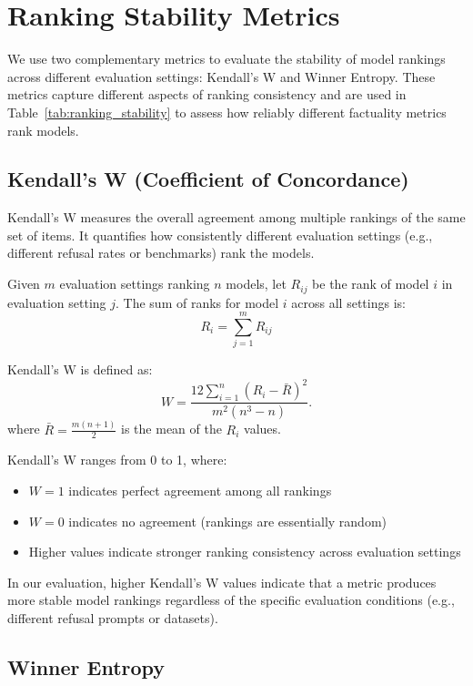 \section{Ranking Stability Metrics}
\label{app:ranking_metrics}

We use two complementary metrics to evaluate the stability of model rankings across different evaluation settings: Kendall's W and Winner Entropy. These metrics capture different aspects of ranking consistency and are used in Table~\ref{tab:ranking_stability} to assess how reliably different factuality metrics rank models.

\subsection{Kendall's W (Coefficient of Concordance)}

Kendall's W measures the overall agreement among multiple rankings of the same set of items. It quantifies how consistently different evaluation settings (e.g., different refusal rates or benchmarks) rank the models.

Given $m$ evaluation settings ranking $n$ models, let $R_{ij}$ be the rank of model $i$ in evaluation setting $j$. The sum of ranks for model $i$ across all settings is:
\[
R_i = \sum_{j=1}^{m} R_{ij}
\]

Kendall's W is defined as:
\[
W = \frac{12 \sum_{i=1}^{n} (R_i - \bar{R})^2}{m^2(n^3 - n)}.
\]
where $\bar{R} = \frac{m(n+1)}{2}$ is the mean of the $R_i$ values.

Kendall's W ranges from 0 to 1, where:
\begin{itemize}
    \item $W = 1$ indicates perfect agreement among all rankings
    \item $W = 0$ indicates no agreement (rankings are essentially random)
    \item Higher values indicate stronger ranking consistency across evaluation settings
\end{itemize}

In our evaluation, higher Kendall's W values indicate that a metric produces more stable model rankings regardless of the specific evaluation conditions (e.g., different refusal prompts or datasets).

\subsection{Winner Entropy}

